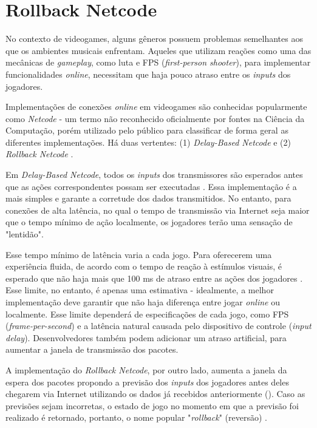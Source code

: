 \section{Rollback Netcode}

No contexto de videogames, alguns gêneros possuem problemas semelhantes aos que os ambientes musicais enfrentam. Aqueles que utilizam reações como uma das mecânicas de \textit{gameplay}, como luta e FPS (\textit{first-person shooter}), para implementar funcionalidades \textit{online}, necessitam que haja pouco atraso entre os \textit{inputs} dos jogadores.

Implementações de conexões \textit{online} em videogames são conhecidas popularmente como \textit{Netcode} - um termo não reconhecido oficialmente por fontes na Ciência da Computação, porém utilizado pelo público para classificar de forma geral as diferentes implementações. Há duas vertentes: (1) \textit{Delay-Based Netcode} e (2) \textit{Rollback Netcode} \cite{rollback}.

Em \textit{Delay-Based Netcode}, todos os \textit{inputs} dos transmissores são esperados antes que as ações correspondentes possam ser executadas \cite{rollback}. Essa implementação é a mais simples e garante a corretude dos dados transmitidos. No entanto, para conexões de alta latência, no qual o tempo de transmissão via Internet seja maior que o tempo mínimo de ação localmente, os jogadores terão uma sensação de "lentidão".

Esse tempo mínimo de latência varia a cada jogo. Para oferecerem uma experiência fluida, de acordo com o tempo de reação à estímulos visuais, é esperado que não haja mais que 100 ms de atraso entre as ações dos jogadores \cite{pubnub}. Esse limite, no entanto, é apenas uma estimativa - idealmente, a melhor implementação deve garantir que não haja diferença entre jogar \textit{online} ou localmente. Esse limite dependerá de especificações de cada jogo, como FPS (\textit{frame-per-second}) e a latência natural causada pelo dispositivo de controle (\textit{input delay}). Desenvolvedores também podem adicionar um atraso artificial, para aumentar a janela de transmissão dos pacotes.

A implementação do \textit{Rollback Netcode}, por outro lado, aumenta a janela da espera dos pacotes propondo a previsão dos \textit{inputs} dos jogadores antes deles chegarem via Internet utilizando os dados já recebidos anteriormente (). Caso as previsões sejam incorretas, o estado de jogo no momento em que a previsão foi realizado é retornado, portanto, o nome popular "\textit{rollback}" (reversão) \cite{rollback}.


